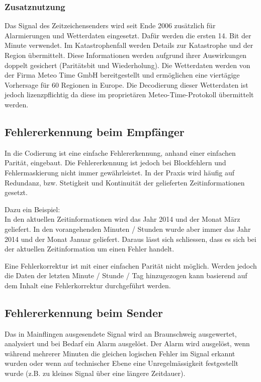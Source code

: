 \subsubsection{Zusatznutzung}
Das Signal des Zeitzeichensenders wird seit Ende 2006 zusätzlich für Alarmierungen und Wetterdaten eingesetzt. Dafür werden die ersten 14. Bit der Minute verwendet. Im Katastrophenfall werden Details zur Katastrophe und der Region übermittelt. Diese Informationen werden aufgrund ihrer Auswirkungen doppelt gesichert (Paritätsbit und Wiederholung). Die Wetterdaten werden von der Firma Meteo Time GmbH bereitgestellt und ermöglichen eine viertägige Vorhersage für 60 Regionen in Europe. Die Decodierung dieser Wetterdaten ist jedoch lizenzpflichtig da diese im proprietären Meteo-Time-Protokoll übermittelt werden.

\subsection{Fehlererkennung beim Empfänger}
In die Codierung ist eine einfache Fehlererkennung, anhand einer einfachen Parität, eingebaut. Die Fehlererkennung ist jedoch bei Blockfehlern und Fehlermaskierung nicht immer gewährleistet. In der Praxis wird häufig auf Redundanz, bzw. Stetigkeit und Kontinuität der gelieferten Zeitinformationen gesetzt.

Dazu ein Beispiel:\\
In den aktuellen Zeitinformationen wird das Jahr 2014 und der Monat März geliefert. In den vorangehenden Minuten / Stunden wurde aber immer das Jahr 2014 und der Monat Januar geliefert. Daraus lässt sich schliessen, dass es sich bei der aktuellen Zeitinformation um einen Fehler handelt.

Eine Fehlerkorrektur ist mit einer einfachen Parität nicht möglich. Werden jedoch die Daten der letzten Minute / Stunde / Tag hinzugezogen kann basierend auf dem Inhalt eine Fehlerkorrektur durchgeführt werden.

\subsection{Fehlererkennung beim Sender}
Das in Mainflingen ausgesendete Signal wird an Braunschweig ausgewertet, analysiert und bei Bedarf ein Alarm ausgelöst. Der Alarm wird ausgelöst, wenn während mehrerer Minuten die gleichen logischen Fehler im Signal erkannt wurden oder wenn auf technischer Ebene eine Unregelmässigkeit festgestellt wurde (z.B. zu kleines Signal über eine längere Zeitdauer).


